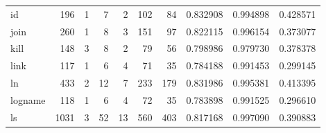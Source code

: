 \begin{longtable}{lrrrrrrrrr}
id        &                    196 &                                  1 &                                 7 &                                2 &                               102 &                              84 &                                0.832908 &                               0.994898 &                             0.428571 \\
join      &                    260 &                                  1 &                                 8 &                                3 &                               151 &                              97 &                                0.822115 &                               0.996154 &                             0.373077 \\
kill      &                    148 &                                  3 &                                 8 &                                2 &                                79 &                              56 &                                0.798986 &                               0.979730 &                             0.378378 \\
link      &                    117 &                                  1 &                                 6 &                                4 &                                71 &                              35 &                                0.784188 &                               0.991453 &                             0.299145 \\
ln        &                    433 &                                  2 &                                12 &                                7 &                               233 &                             179 &                                0.831986 &                               0.995381 &                             0.413395 \\
logname   &                    118 &                                  1 &                                 6 &                                4 &                                72 &                              35 &                                0.783898 &                               0.991525 &                             0.296610 \\
ls        &                   1031 &                                  3 &                                52 &                               13 &                               560 &                             403 &                                0.817168 &                               0.997090 &                             0.390883 \\

\end{longtable}
